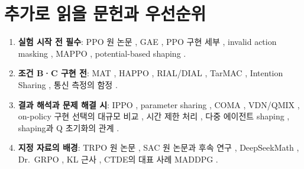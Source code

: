 \documentclass[11pt,a4paper]{article}
\begin{document}
\section{추가로 읽을 문헌과 우선순위}\label{sec:reading}
\begin{enumerate}
 \item \textbf{실험 시작 전 필수}: PPO 원 논문 \cite{ppo}, GAE \cite{gae}, PPO 구현 세부 \cite{ppo-details}, invalid action masking \cite{masking}, MAPPO \cite{mappo}, potential-based shaping \cite{ng1999}.
 \item \textbf{조건 B·C 구현 전}: MAT \cite{mat}, HAPPO \cite{happo}, RIAL/DIAL \cite{dial}, TarMAC \cite{tarmac}, Intention Sharing \cite{intention}, 통신 측정의 함정 \cite{lowe2019}.
 \item \textbf{결과 해석과 문제 해결 시}: IPPO \cite{ippo}, parameter sharing \cite{gupta2017,terry2020}, COMA \cite{coma}, VDN/QMIX \cite{vdn,qmix}, on-policy 구현 선택의 대규모 비교 \cite{whatmatters}, 시간 제한 처리 \cite{timelimits}, 다중 에이전트 shaping \cite{devlin2011}, shaping과 Q 초기화의 관계 \cite{wiewiora2003}.
 \item \textbf{지정 자료의 배경}: TRPO 원 논문 \cite{trpo}, SAC 원 논문과 후속 연구 \cite{sac,sac-apps,sac-discrete}, DeepSeekMath \cite{deepseekmath}, Dr.~GRPO \cite{drgrpo}, KL 근사 \cite{kl-approx}, CTDE의 대표 사례 MADDPG \cite{maddpg}.
\end{enumerate}
\end{document}
